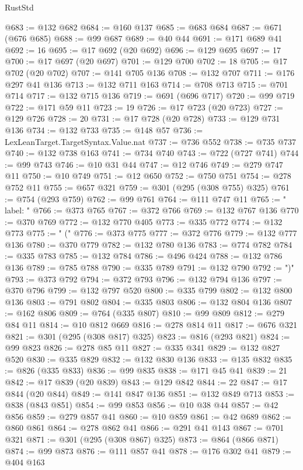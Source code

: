 \begin{lexlean}{RustStd}
\begin{coremodule}
{\begin{coremodule}
{{{{{{{{{{{{{{{{{{{{{{{{{{{{{{{@683 := @132 @682
@684 := @160 @137
@685 := @683 @684
@687 := @671 (@676 @685)
@688 := @99 @687
@689 := @40 @44
@691 := @171 @689 @41
@692 := 16
@695 := @17 @692 (@20 @692)
@696 := @129 @695
@697 := 17
@700 := @17 @697 (@20 @697)
@701 := @129 @700
@702 := 18
@705 := @17 @702 (@20 @702)
@707 := @141 @705 @136
@708 := @132 @707
@711 := @176 @297 @41 @136
@713 := @132 @711 @163
@714 := @708 @713
@715 := @701 @714
@717 := @132 @715 @136
@719 := @691 (@696 @717)
@720 := @99 @719
@722 := @171 @59 @11
@723 := 19
@726 := @17 @723 (@20 @723)
@727 := @129 @726
@728 := 20
@731 := @17 @728 (@20 @728)
@733 := @129 @731 @136
@734 := @132 @733
@735 := @148 @57
@736 := LexLeanTarget.TargetSyntax.Value.nat
@737 := @736 @552
@738 := @735 @737
@740 := @132 @738 @163
@741 := @734 @740
@743 := @722 (@727 @741)
@744 := @99 @743
@746 := @10 @31 @44
@747 := @12 @746
@749 := @279 @747 @11
@750 := @10 @749
@751 := @12 @650
@752 := @750 @751
@754 := @278 @752 @11
@755 := @657 @321
@759 := @301 (@295 (@308 @755) @325)
@761 := @754 (@293 @759)
@762 := @99 @761
@764 := @111 @747 @11
@765 := "  label: "
@766 := @373 @765
@767 := @372 @766
@769 := @132 @767 @136
@770 := @370 @769
@772 := @132 @770 @405
@773 := @335 @772
@774 := @132 @773
@775 := " ("
@776 := @373 @775
@777 := @372 @776
@779 := @132 @777 @136
@780 := @370 @779
@782 := @132 @780 @136
@783 := @774 @782
@784 := @335 @783
@785 := @132 @784
@786 := @496 @424
@788 := @132 @786 @136
@789 := @785 @788
@790 := @335 @789
@791 := @132 @790
@792 := ")"
@793 := @373 @792
@794 := @372 @793
@796 := @132 @794 @136
@797 := @370 @796
@799 := @132 @797 @520
@800 := @335 @799
@802 := @132 @800 @136
@803 := @791 @802
@804 := @335 @803
@806 := @132 @804 @136
@807 := @162 @806
@809 := @764 (@335 @807)
@810 := @99 @809
@812 := @279 @84 @11
@814 := @10 @812 @669
@816 := @278 @814 @11
@817 := @676 @321
@821 := @301 (@295 (@308 @817) @325)
@823 := @816 (@293 @821)
@824 := @99 @823
@826 := @278 @85 @11
@827 := @335 @341
@829 := @132 @827 @520
@830 := @335 @829
@832 := @132 @830 @136
@833 := @135 @832
@835 := @826 (@335 @833)
@836 := @99 @835
@838 := @171 @45 @41
@839 := 21
@842 := @17 @839 (@20 @839)
@843 := @129 @842
@844 := 22
@847 := @17 @844 (@20 @844)
@849 := @141 @847 @136
@851 := @132 @849 @713
@853 := @838 (@843 @851)
@854 := @99 @853
@856 := @10 @38 @44
@857 := @42 @856
@859 := @279 @857 @41
@860 := @10 @859
@861 := @42 @689
@862 := @860 @861
@864 := @278 @862 @41
@866 := @291 @41 @143
@867 := @701 @321
@871 := @301 (@295 (@308 @867) @325)
@873 := @864 (@866 @871)
@874 := @99 @873
@876 := @111 @857 @41
@878 := @176 @302 @41
@879 := @404 @163
}}}}}}}}}}}}}}}}}}}}}}}}}}}}}}}
\end{coremodule}}
\end{coremodule}
\end{lexlean}
